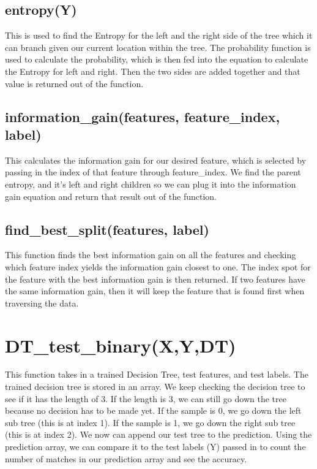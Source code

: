 \documentclass{article}
\begin{document}
\subsection{entropy(Y)}
This is used to find the Entropy for the left and the right side of the tree which it can branch given our current location within the tree. The probability function is used to calculate the probability, which is then fed into the equation to calculate the Entropy for left and right. Then the two sides are added together and that value is returned out of the function.

\subsection{information\_gain(features, feature\_index, label)}
This calculates the information gain for our desired feature, which is selected by passing in the index of that feature through feature\_index. We find the parent entropy, and it's left and right children so we can plug it into the information gain equation and return that result out of the function.

\subsection{find\_best\_split(features, label)}
This function finds the best information gain on all the features and checking which feature index yields the information gain closest to one. The index spot for the feature with the best information gain is then returned. If two features have the same information gain, then it will keep the feature that is found first when traversing the data.

\section{DT\_test\_binary(X,Y,DT)}
This function takes in a trained Decision Tree, test features, and test labels. The trained decision tree is stored in an array. We keep checking the decision tree to see if it has the length of 3. If the length is 3, we can still go down the tree because no decision has to be made yet. If the sample is 0, we go down the left sub tree (this is at index 1). If the sample is 1, we go down the right sub tree (this is at index 2). We now can append our test tree to the prediction. Using the prediction array, we can compare it to the test labels (Y) passed in to count the number of matches in our prediction array and see the accuracy. 
\end{document}
